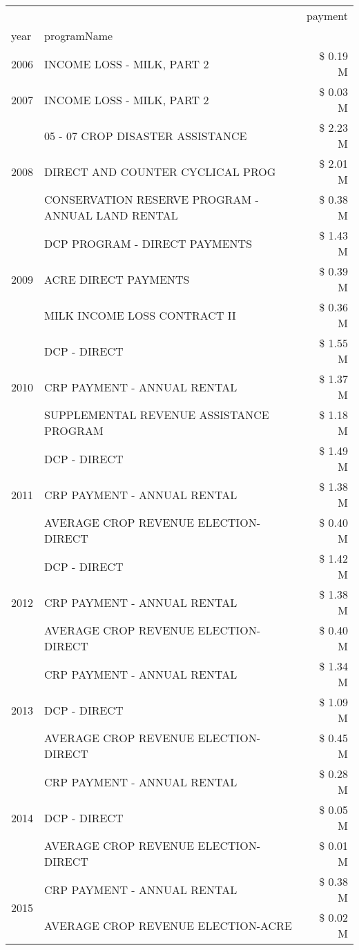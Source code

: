 \begin{tabular}{llr}
\toprule
 &  & payment \\
year & programName &  \\
\midrule
2006 & INCOME LOSS - MILK, PART 2 & \$ 0.19 M \\
\cline{1-3}
2007 & INCOME LOSS - MILK, PART 2 & \$ 0.03 M \\
\cline{1-3}
\multirow[t]{3}{*}{2008} & 05 - 07 CROP DISASTER ASSISTANCE & \$ 2.23 M \\
 & DIRECT AND COUNTER CYCLICAL PROG & \$ 2.01 M \\
 & CONSERVATION RESERVE PROGRAM - ANNUAL LAND RENTAL & \$ 0.38 M \\
\cline{1-3}
\multirow[t]{3}{*}{2009} & DCP PROGRAM - DIRECT PAYMENTS & \$ 1.43 M \\
 & ACRE DIRECT PAYMENTS & \$ 0.39 M \\
 & MILK INCOME LOSS CONTRACT II & \$ 0.36 M \\
\cline{1-3}
\multirow[t]{3}{*}{2010} & DCP - DIRECT & \$ 1.55 M \\
 & CRP PAYMENT - ANNUAL RENTAL & \$ 1.37 M \\
 & SUPPLEMENTAL REVENUE ASSISTANCE PROGRAM & \$ 1.18 M \\
\cline{1-3}
\multirow[t]{3}{*}{2011} & DCP - DIRECT & \$ 1.49 M \\
 & CRP PAYMENT - ANNUAL RENTAL & \$ 1.38 M \\
 & AVERAGE CROP REVENUE ELECTION-DIRECT & \$ 0.40 M \\
\cline{1-3}
\multirow[t]{3}{*}{2012} & DCP - DIRECT & \$ 1.42 M \\
 & CRP PAYMENT - ANNUAL RENTAL & \$ 1.38 M \\
 & AVERAGE CROP REVENUE ELECTION-DIRECT & \$ 0.40 M \\
\cline{1-3}
\multirow[t]{3}{*}{2013} & CRP PAYMENT - ANNUAL RENTAL & \$ 1.34 M \\
 & DCP - DIRECT & \$ 1.09 M \\
 & AVERAGE CROP REVENUE ELECTION-DIRECT & \$ 0.45 M \\
\cline{1-3}
\multirow[t]{3}{*}{2014} & CRP PAYMENT - ANNUAL RENTAL & \$ 0.28 M \\
 & DCP - DIRECT & \$ 0.05 M \\
 & AVERAGE CROP REVENUE ELECTION-DIRECT & \$ 0.01 M \\
\cline{1-3}
\multirow[t]{3}{*}{2015} & CRP PAYMENT - ANNUAL RENTAL & \$ 0.38 M \\
 & AVERAGE CROP REVENUE ELECTION-ACRE & \$ 0.02 M \\

\end{tabular}
